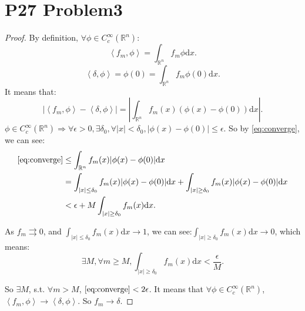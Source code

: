 \documentclass[a4paper]{ctexart}
\newcommand{\dif}{\mathrm{d}}
\begin{document}
\section*{P27 Problem3}
\begin{proof}
    By definition, $\forall\phi\in C_{c}^{\infty}(\mathbb{R}^{n})$:
    \begin{equation}
        \label{eq:fm}
        \left<f_{m},\phi\right>=\int_{\mathbb{R}^{n}}f_{m}\phi\dif x.
    \end{equation}
    \begin{equation}
        \label{eq:delta}
        \left<\delta,\phi\right>=\phi(0)=\int_{\mathbb{R}^{n}}f_{m}\phi(0)\dif x.
    \end{equation}
    It means that:
    \begin{equation}
        \label{eq:converge}
        |\left<f_{m},\phi\right>-\left<\delta,\phi\right>|=|\int_{\mathbb{R}^{n}}f_{m}(x)(\phi(x)-\phi(0))\dif x|.
    \end{equation}
    $\phi\in C_{c}^{\infty}(\mathbb{R}^{n})\Rightarrow\forall\epsilon>0,\exists\delta_{0},\forall|x|<\delta_{0},|\phi(x)-\phi(0)|\le\epsilon$. So by \eqref{eq:converge}, we can see:
    \begin{equation}
        \begin{aligned}
            \eqref{eq:converge}&\le\int_{\mathbb{R}^{n}}f_{m}(x)|\phi(x)-\phi(0)|\dif x\\
            &=\int_{|x|\le\delta_{0}}f_{m}(x)|\phi(x)-\phi(0)|\dif x+\int_{|x|\ge\delta_{0}}f_{m}(x)|\phi(x)-\phi(0)|\dif x\\
            &<\epsilon+M\int_{|x|\ge\delta_{0}}f_{m}(x)\dif x.
        \end{aligned}
    \end{equation}

    As $f_{m}\rightrightarrows 0$, and $\int_{|x|\le\delta_{0}}f_{m}(x)\dif x\rightarrow 1$, we can see:$\int_{|x|\ge\delta_{0}}f_{m}(x)\dif x\rightarrow 0$, which means:
    \begin{equation}
        \exists M,\forall m\ge M, \int_{|x|\ge\delta_{0}}f_{m}(x)\dif x<\frac{\epsilon}{M}.
    \end{equation}

    So $\exists M$, s.t. $\forall m>M$, $\eqref{eq:converge}<2\epsilon$. It means that $\forall\phi\in C_{c}^{\infty}(\mathbb{R}^{n})$, $\left<f_{m},\phi\right>\rightarrow\left<\delta,\phi\right>$. So $f_{m}\rightarrow\delta$.
\end{proof}
\end{document}
